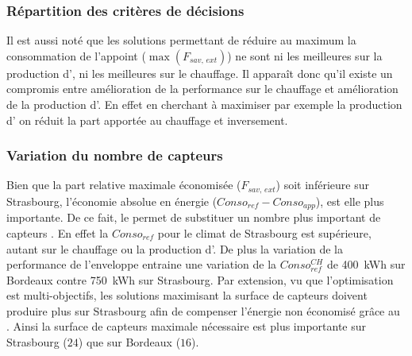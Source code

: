 \subsubsection{Répartition des critères de décisions} %
\label{ssub:repartition_des_criteres_de_decisions}
Il est aussi noté que les solutions permettant de réduire au maximum la
consommation de l’appoint ($\max(F_{sav,\,ext})$) ne sont ni les meilleures sur
la production d’, ni les meilleures sur le chauffage. Il apparaît donc
qu’il existe un compromis entre amélioration de la performance sur le chauffage et
amélioration de la production d’. En effet en cherchant à maximiser par exemple la production
d’ on réduit la part apportée au chauffage et inversement.



\subsubsection{Variation du nombre de capteurs } %
\label{ssub:variation_du_nombre_de_capteurs_pv}
Bien que la part relative maximale économisée ($F_{sav,\,ext}$) soit inférieure sur
Strasbourg, l’économie absolue en énergie ($Conso_{ref} - Conso_{app}$), est elle plus
importante. De ce fait, le  permet de substituer un nombre plus important de
capteurs . En effet la $Conso_{ref}$ pour le climat de Strasbourg est supérieure,
autant sur le chauffage ou la production d’. De plus la variation de la
performance de l’enveloppe entraine une variation de la $Conso_{ref}^{CH}$ de
\SI{400}{kWh} sur Bordeaux contre \SI{750}{kWh} sur Strasbourg. Par extension, vu que
l’optimisation est multi-objectifs, les solutions maximisant la surface de capteurs
 doivent produire plus sur Strasbourg afin de compenser l’énergie non économisé
grâce au . Ainsi la surface de capteurs  maximale nécessaire est plus
importante sur Strasbourg ($24$) que sur Bordeaux ($16$).

